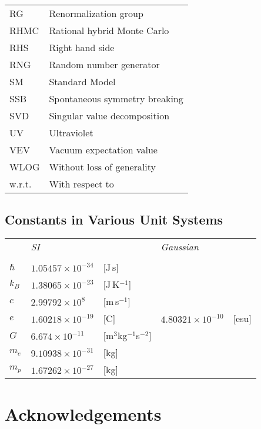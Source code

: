 \documentclass[12pt]{book}
\theoremstyle{definition}
\newenvironment{frontstuff}
  {\centering\chapter*{}}
  {\clearpage}
\begin{document}
\begin{frontstuff}
\begin{tabular}{ll}
RG      &       Renormalization group \\
RHMC    &       Rational hybrid Monte Carlo \\
RHS     &       Right hand side \\
RNG     &       Random number generator \\
SM      &       Standard Model \\
SSB     &       Spontaneous symmetry breaking\\
SVD     &       Singular value decomposition\\
UV      &       Ultraviolet \\
VEV     &       Vacuum expectation value\\ 
WLOG    &       Without loss of generality\\
w.r.t.  &       With respect to\\
\end{tabular}
\clearpage


\section*{Constants in Various Unit Systems}
\begin{tabularx}{\linewidth}{LlLll}
 & {\it SI} && {\it Gaussian}&\\ 
\vspace{2mm}\\
$\hbar$  & $1.05457\times 10^{-34}$ & [J\,s]
         & & \\
$k_B$    & $1.38065\times 10^{-23}$ & [J\,K$^{-1}$]
         & & \\
$c$      & $2.99792\times 10^8$ & [m\,s$^{-1}$]
         & & \\
$e$      & $1.60218\times 10^{-19}$ & [C] 
         & $4.80321\times 10^{-10}$ & [esu]\\
$G$      & $6.674\times 10^{-11}$ & [m$^3$kg$^{-1}$s$^{-2}$]
         & & \\
$m_e$    & $9.10938\times 10^{-31}$ & [kg]
         & & \\
$m_p$    & $1.67262\times 10^{-27}$ & [kg]
         & & \\
\end{tabularx}
\clearpage


\end{frontstuff} %


\chapter{Acknowledgements}
\end{document}
